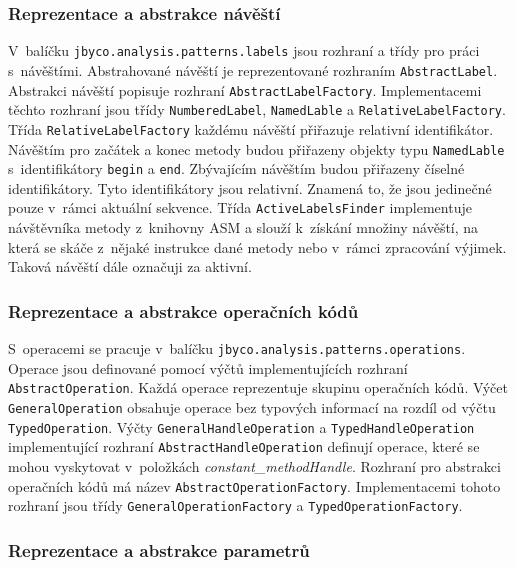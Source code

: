 \subsubsection{Reprezentace a abstrakce návěští}

V~balíčku \texttt{jbyco.analysis.patterns.labels} jsou rozhraní a třídy pro práci s~návěštími. Abstrahované návěští je reprezentované rozhraním \texttt{AbstractLabel}. Abstrakci návěští popisuje rozhraní \texttt{AbstractLabelFactory}. Implementacemi těchto rozhraní jsou třídy \texttt{NumberedLabel}, \texttt{NamedLable} a \texttt{RelativeLabelFactory}. Třída \texttt{RelativeLabelFactory} každému návěští přiřazuje relativní identifikátor. Návěštím pro začátek a konec metody budou přiřazeny objekty typu \texttt{NamedLable} s~identifikátory \texttt{begin} a \texttt{end}. Zbývajícím návěštím budou přiřazeny číselné identifikátory. Tyto identifikátory jsou relativní. Znamená to, že jsou jedinečné pouze v~rámci aktuální sekvence. Třída \texttt{ActiveLabelsFinder} implementuje návštěvníka metody z~knihovny ASM a slouží k~získání množiny návěští, na která se skáče z~nějaké instrukce dané metody nebo v~rámci zpracování výjimek. Taková návěští dále označuji za aktivní.

\subsubsection{Reprezentace a abstrakce operačních kódů}

S~operacemi se pracuje v~balíčku \texttt{jbyco.analysis.patterns.operations}. Operace jsou definované pomocí výčtů implementujících rozhraní \texttt{AbstractOperation}. Každá operace reprezentuje skupinu operačních kódů. Výčet \texttt{GeneralOperation} obsahuje operace bez typových informací na rozdíl od výčtu \texttt{TypedOperation}. Výčty \texttt{GeneralHandleOperation} a \texttt{TypedHandleOperation} implementující rozhraní \texttt{AbstractHandleOperation} definují operace, které se mohou vyskytovat v~položkách \textit{constant\_methodHandle}. Rozhraní pro abstrakci operačních kódů má název \texttt{AbstractOperationFactory}. Implementacemi tohoto rozhraní jsou třídy \texttt{GeneralOperationFactory} a \texttt{TypedOperationFactory}. 

\subsubsection{Reprezentace a abstrakce parametrů}

